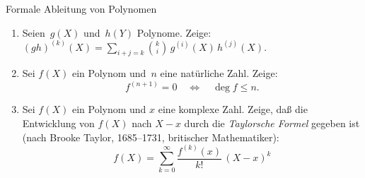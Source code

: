 \documentclass{algblatt}
\begin{document}
\begin{aufgabe}{Formale Ableitung von Polynomen}
\begin{enumerate}
\item Seien~$g(X)$ und~$h(Y)$ Polynome. Zeige:
$
  (g h)^{(k)}(X)
  = \sum_{i + j = k} \binom k i \, g^{(i)}(X) \, h^{(j)}(X).
$

\item Sei $f(X)$ ein Polynom und~$n$ eine natürliche Zahl. Zeige:
\[ f^{(n + 1)} = 0 \quad\Longleftrightarrow\quad \deg f \leq n. \]

\item Sei $f(X)$ ein Polynom und $x$ eine komplexe Zahl. Zeige, daß die
Entwicklung von $f(X)$ nach $X - x$ durch die \emph{Taylorsche Formel} gegeben
ist (nach
Brooke Taylor, 1685--1731, britischer Mathematiker):
\[
    f(X) = \sum_{k = 0}^\infty \frac{f^{(k)}(x)}{k!} \, (X - x)^k
\]
\end{enumerate}
\end{aufgabe}
\end{document}
